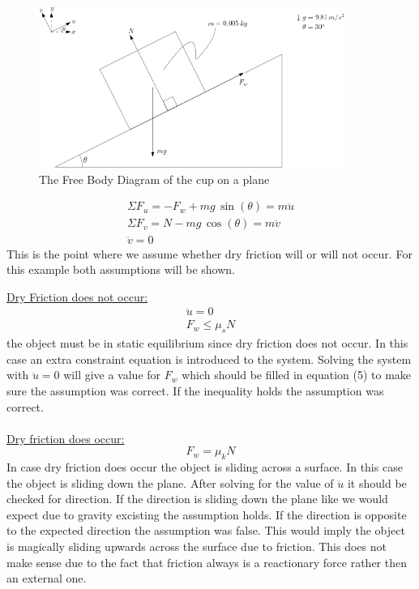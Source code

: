\documentclass[11pt, a4paper]{article}
\begin{document}
\begin{figure}[h]
    \centerline{\includegraphics[width=10cm]{images/Crate_Friction.png}}
    \caption{The Free Body Diagram of the cup on a plane}
\end{figure}

\begin{gather}
    \Sigma F_u = -F_w + mg \, \sin(\theta) = m\ddot{u}\\
    \Sigma F_v = N - mg \, \cos(\theta) = m\ddot{v}\\
    \ddot{v} = 0
\end{gather}
This is the point where we assume whether dry friction will or will not occur. For this example
both assumptions will be shown.
\newpage

\underline{Dry Friction does not occur:}\\
\begin{gather}
    \ddot{u} = 0 \\
    F_w \leq \mu_s N
\end{gather}
the object must be in static equilibrium since dry friction does not occur. In this case
an extra constraint equation is introduced to the system. Solving the system with
$\ddot{u}=0$ will give a value for $F_w$ which should be filled in equation
(5) to make sure the assumption was correct. If the inequality holds the assumption
was correct.\\
\\

\setcounter{equation}{3}
\underline{Dry friction does occur:}\\
\begin{equation}
    F_w = \mu_k N
\end{equation}
In case dry friction does occur the object is sliding across a surface. In this
case the object is sliding down the plane. After solving for the value of $\ddot{u}$ it
should be checked for direction. If the direction is sliding down the plane like we
would expect due to gravity excisting the assumption holds. If the direction is opposite
to the expected direction the assumption was false. This would imply the object is magically 
sliding upwards across the surface due to friction. This does not make sense due to the fact
that friction always is a reactionary force rather then an external one. 
\end{document}
